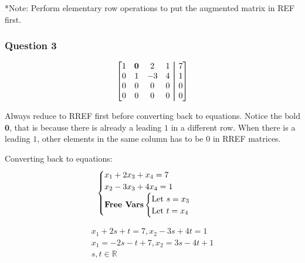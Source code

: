 \medskip

*Note: Perform elementary row operations to put the augmented matrix in REF first.

\subsubsection{Question 3}
\[
  \begin{bmatrix}
    1 & \B{0} & 2 & 1 &\aug& 7 \\
    0 & 1 & -3 & 4 &\aug& 1 \\
    0 & 0 & 0 & 0 &\aug& 0 \\
    0 & 0 & 0 & 0 &\aug& 0 \\
  \end{bmatrix}
\]

\medskip

Always reduce to RREF first before converting back to equations. Notice the bold $\mathbf{0}$, that is because there is already a leading $1$ in a different row. When there is a leading $1$, other elements in the same column has to be $0$ in RREF matrices.

Converting back to equations:
\[
  \begin{cases}
    x_1 + 2x_3 + x_4 = 7 \\
    x_2 - 3x_3 + 4x_4 = 1 \\
    \text{\textbf{Free Vars}}
    \begin{cases}
        \text{Let } s = x_3 \\
        \text{Let } t = x_4 \\
    \end{cases}
  \end{cases}
\]


\begin{equation*}
\begin{gathered}
    x_1 + 2s + t = 7, x_2 - 3s + 4t = 1 \\
    x_1 = -2s -t +7, x_2 = 3s - 4t + 1 \\
    s, t \in \mathbb{R} \\ 
\end{gathered}
\end{equation*}